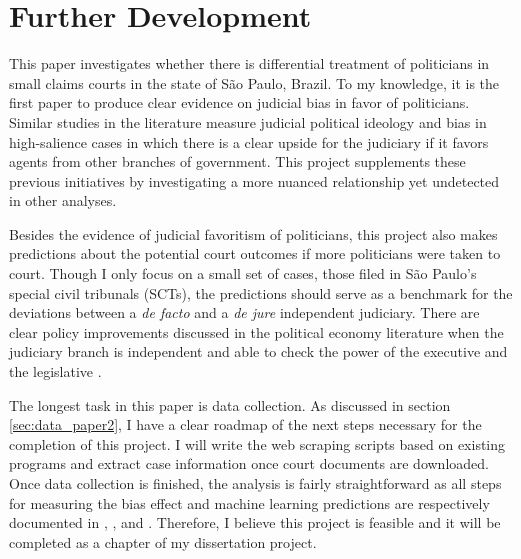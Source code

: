 \documentclass[11pt]{article}
\begin{document}
\section{Further Development} \label{sec:conclusion_paper2}

This paper investigates whether there is differential treatment of politicians in small claims courts in the state of São Paulo, Brazil. To my knowledge, it is the first paper to produce clear evidence on judicial bias in favor of politicians. Similar studies in the literature measure judicial political ideology and bias in high-salience cases in which there is a clear upside for the judiciary if it favors agents from other branches of government. This project supplements these previous initiatives by investigating a more nuanced relationship yet undetected in other analyses.

Besides the evidence of judicial favoritism of politicians, this project also makes predictions about the potential court outcomes if more politicians were taken to court. Though I only focus on a small set of cases, those filed in São Paulo's special civil tribunals (SCTs), the predictions should serve as a benchmark for the deviations between a \emph{de facto} and a \emph{de jure} independent judiciary. There are clear policy improvements discussed in the political economy literature when the judiciary branch is independent and able to check the power of the executive and the legislative \citep{BalandChapter69Governance2010}.

The longest task in this paper is data collection. As discussed in section \ref{sec:data_paper2}, I have a clear roadmap of the next steps necessary for the completion of this project. I will write the web scraping scripts based on existing programs and extract case information once court documents are downloaded. Once data collection is finished, the analysis is fairly straightforward as all steps for measuring the bias effect and machine learning predictions are respectively documented in \citet{AbramsJudgesVaryTheir2012}, \citet{AtheypredictionUsingbig2017,AtheyImpactMachineLearning2019}, and \citet{KleinbergPredictionPolicyProblems2015,KleinbergHumanDecisionsMachine2018}. Therefore, I believe this project is feasible and it will be completed as a chapter of my dissertation project.

\clearpage

\setlength\bibsep{0pt}


\end{document}
